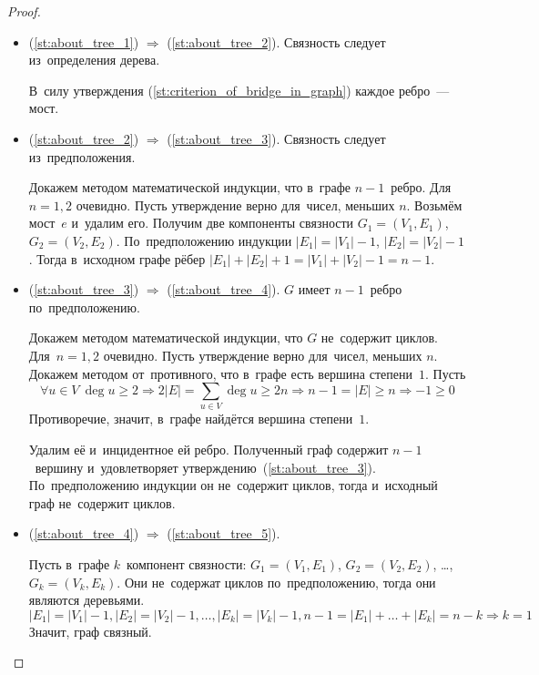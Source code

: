 \begin{proof}
\begin{itemize}
	\item (\ref{st:about_tree_1}) $\Rightarrow$ (\ref{st:about_tree_2}).
	Связность следует из~определения дерева.
	
	В~силу утверждения (\ref{st:criterion_of_bridge_in_graph}) каждое ребро~--- мост.
	
	\item (\ref{st:about_tree_2}) $\Rightarrow$ (\ref{st:about_tree_3}).
	Связность следует из~предположения.
	
	Докажем методом математической индукции, что в~графе $n - 1$~ребро.
	\indbase Для~$n = 1, 2$ очевидно.
	\indstep Пусть утверждение верно для~чисел, меньших $n$.
	Возьмём мост~$e$ и~удалим его.
	Получим две компоненты связности $G_1 = (V_1, E_1)$, $G_2 = (V_2, E_2)$.
	По~предположению индукции $|E_1| = |V_1| - 1$, $|E_2| = |V_2| - 1$.
	Тогда в~исходном графе рёбер $|E_1| + |E_2| + 1 = |V_1| + |V_2| - 1 = n - 1$. \indend
	
	\item (\ref{st:about_tree_3}) $\Rightarrow$ (\ref{st:about_tree_4}).
	$G$ имеет $n - 1$~ребро по~предположению.
	
	Докажем методом математической индукции, что $G$ не~содержит циклов.
	\indbase Для~$n = 1, 2$ очевидно.
	\indstep Пусть утверждение верно для~чисел, меньших $n$.
	Докажем методом от~противного, что в~графе есть вершина степени~$1$.
	Пусть
	\begin{equation*}
	\forall u \in V \ \deg u \geqslant 2 \Rightarrow 2|E| = \sum_{u \in V} \deg u \geqslant 2n \Rightarrow n - 1 = |E| \geqslant n \Rightarrow -1 \geqslant 0
	\end{equation*}
	Противоречие, значит, в~графе найдётся вершина степени~$1$.
	
	Удалим её и~инцидентное ей ребро.
	Полученный граф содержит $n - 1$~вершину и~удовлетворяет утверждению~(\ref{st:about_tree_3}).
	По~предположению индукции он не~содержит циклов, тогда и~исходный граф не~содержит циклов. \indend
	
	\item (\ref{st:about_tree_4}) $\Rightarrow$ (\ref{st:about_tree_5}).
	
	Пусть в~графе $k$~компонент связности: $G_1 = (V_1, E_1)$, $G_2 = (V_2, E_2)$, \ldots, $G_k = (V_k, E_k)$.
	Они не~содержат циклов по~предположению, тогда они являются деревьями.
	\begin{equation*}
	|E_1| = |V_1| - 1, |E_2| = |V_2| - 1, \ldots, |E_k| = |V_k| - 1,
	n - 1 = |E_1| + \ldots + |E_k| = n - k \Rightarrow k = 1
	\end{equation*}
	Значит, граф связный.
	

\end{itemize}
\end{proof}
